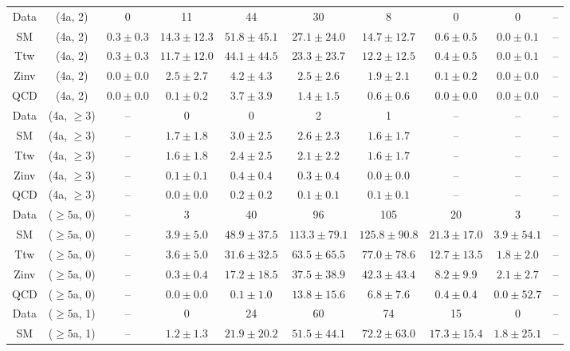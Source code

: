 \begin{table}[h!]
{\begin{tabular}{cccccccccc}
	Data & (4a, 2) & 0 & 11 & 44 & 30 & 8 & 0 & 0 & -- \\[0.5ex] 
	SM & (4a, 2) & $0.3\pm 0.3$ & $14.3\pm 12.3$ & $51.8\pm 45.1$ & $27.1\pm 24.0$ & $14.7\pm 12.7$ & $0.6\pm 0.5$ & $0.0\pm 0.1$ & -- \\[0.5ex] 
	Ttw & (4a, 2) & $0.3\pm 0.3$ & $11.7\pm 12.0$ & $44.1\pm 44.5$ & $23.3\pm 23.7$ & $12.2\pm 12.5$ & $0.4\pm 0.5$ & $0.0\pm 0.1$ & -- \\[0.5ex] 
	Zinv & (4a, 2) & $0.0\pm 0.0$ & $2.5\pm 2.7$ & $4.2\pm 4.3$ & $2.5\pm 2.6$ & $1.9\pm 2.1$ & $0.1\pm 0.2$ & $0.0\pm 0.0$ & -- \\[0.5ex] 
	QCD & (4a, 2) & $0.0\pm 0.0$ & $0.1\pm 0.2$ & $3.7\pm 3.9$ & $1.4\pm 1.5$ & $0.6\pm 0.6$ & $0.0\pm 0.0$ & $0.0\pm 0.0$ & -- \\[0.5ex] 
	Data & (4a, $\ge3$) & -- & 0 & 0 & 2 & 1 & -- & -- & -- \\[0.5ex] 
	SM & (4a, $\ge3$) & -- & $1.7\pm 1.8$ & $3.0\pm 2.5$ & $2.6\pm 2.3$ & $1.6\pm 1.7$ & -- & -- & -- \\[0.5ex] 
	Ttw & (4a, $\ge3$) & -- & $1.6\pm 1.8$ & $2.4\pm 2.5$ & $2.1\pm 2.2$ & $1.6\pm 1.7$ & -- & -- & -- \\[0.5ex] 
	Zinv & (4a, $\ge3$) & -- & $0.1\pm 0.1$ & $0.4\pm 0.4$ & $0.3\pm 0.4$ & $0.0\pm 0.0$ & -- & -- & -- \\[0.5ex] 
	QCD & (4a, $\ge3$) & -- & $0.0\pm 0.0$ & $0.2\pm 0.2$ & $0.1\pm 0.1$ & $0.1\pm 0.1$ & -- & -- & -- \\[0.5ex] 
	Data & ($\ge5$a, 0) & -- & 3 & 40 & 96 & 105 & 20 & 3 & -- \\[0.5ex] 
	SM & ($\ge5$a, 0) & -- & $3.9\pm 5.0$ & $48.9\pm 37.5$ & $113.3\pm 79.1$ & $125.8\pm 90.8$ & $21.3\pm 17.0$ & $3.9\pm 54.1$ & -- \\[0.5ex] 
	Ttw & ($\ge5$a, 0) & -- & $3.6\pm 5.0$ & $31.6\pm 32.5$ & $63.5\pm 65.5$ & $77.0\pm 78.6$ & $12.7\pm 13.5$ & $1.8\pm 2.0$ & -- \\[0.5ex] 
	Zinv & ($\ge5$a, 0) & -- & $0.3\pm 0.4$ & $17.2\pm 18.5$ & $37.5\pm 38.9$ & $42.3\pm 43.4$ & $8.2\pm 9.9$ & $2.1\pm 2.7$ & -- \\[0.5ex] 
	QCD & ($\ge5$a, 0) & -- & $0.0\pm 0.0$ & $0.1\pm 1.0$ & $13.8\pm 15.6$ & $6.8\pm 7.6$ & $0.4\pm 0.4$ & $0.0\pm 52.7$ & -- \\[0.5ex] 
	Data & ($\ge5$a, 1) & -- & 0 & 24 & 60 & 74 & 15 & 0 & -- \\[0.5ex] 
	SM & ($\ge5$a, 1) & -- & $1.2\pm 1.3$ & $21.9\pm 20.2$ & $51.5\pm 44.1$ & $72.2\pm 63.0$ & $17.3\pm 15.4$ & $1.8\pm 25.1$ & -- \\[0.5ex] 

\end{tabular}}
\end{table}
